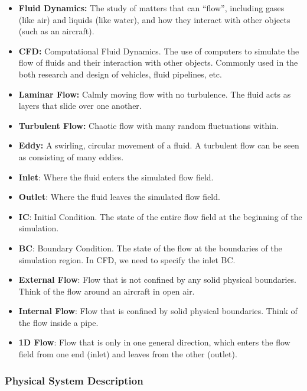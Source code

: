 \documentclass[12pt]{article}
\begin{document}
\begin{itemize}
  \item \textbf{Fluid Dynamics:} The study of matters that can ``flow'', including gases (like air) and liquids (like water), and how they interact with other objects (such as an aircraft).
  \item \textbf{CFD:} Computational Fluid Dynamics. The use of computers to simulate the flow of fluids and their interaction with other objects. Commonly used in the both research and design of vehicles, fluid pipelines, etc.
  \item \textbf{Laminar Flow:} Calmly moving flow with no turbulence. The fluid acts as layers that slide over one another.
  \item \textbf{Turbulent Flow:} Chaotic flow with many random fluctuations within.
  \item \textbf{Eddy:} A swirling, circular movement of a fluid. A turbulent flow can be seen as consisting of many eddies.
  \item \textbf{Inlet}: Where the fluid enters the simulated flow field.
  \item \textbf{Outlet}: Where the fluid leaves the simulated flow field.
  \item \textbf{IC}: Initial Condition. The state of the entire flow field at the beginning of the simulation.
  \item \textbf{BC}: Boundary Condition. The state of the flow at the boundaries of the simulation region. In CFD, we need to specify the inlet BC. 
  \item \textbf{External Flow}: Flow that is not confined by any solid physical boundaries. Think of the flow around an aircraft in open air.
  \item \textbf{Internal Flow}: Flow that is confined by solid physical boundaries. Think of the flow inside a pipe.
  \item \textbf{1D Flow}: Flow that is only in one general direction, which enters the flow field from one end (inlet) and leaves from the other (outlet).
  \end{itemize}

\subsubsection{Physical System Description} \label{sec_phySystDescrip}
\end{document}
